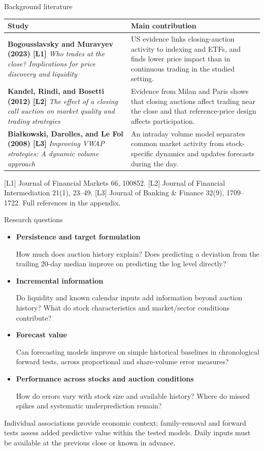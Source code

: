 \documentclass[aspectratio=169,11pt]{beamer}
\newcommand{\source}[1]{\par\vfill{\fontsize{7.5}{9}\selectfont\color{Muted}#1\par}}
\newenvironment{points}{\begin{itemize}\setlength{\itemsep}{0.65em}}{\end{itemize}}
\begin{document}
\begin{frame}{Background literature}
\small
\begin{tabularx}{\textwidth}{@{}L{6.0cm}Y@{}}
\toprule
\textbf{Study} & \textbf{Main contribution}\\
\midrule
\textbf{Bogousslavsky and Muravyev (2023) [L1]}\newline
\emph{Who trades at the close? Implications for price discovery and liquidity}
& US evidence links closing-auction activity to indexing and ETFs, and finds lower price impact than in continuous trading in the studied setting.\\[0.9em]
\textbf{Kandel, Rindi, and Bosetti (2012) [L2]}\newline
\emph{The effect of a closing call auction on market quality and trading strategies}
& Evidence from Milan and Paris shows that closing auctions affect trading near the close and that reference-price design affects participation.\\[0.9em]
\textbf{Bia{\l}kowski, Darolles, and Le Fol (2008) [L3]}\newline
\emph{Improving VWAP strategies: A dynamic volume approach}
& An intraday volume model separates common market activity from stock-specific dynamics and updates forecasts during the day.\\
\bottomrule
\end{tabularx}
\source{[L1] Journal of Financial Markets 66, 100852. [L2] Journal of Financial Intermediation 21(1), 23--49. [L3] Journal of Banking \& Finance 32(9), 1709--1722. Full references in the appendix.}
\end{frame}

\begin{frame}{Research questions}
\begin{points}
\item \textbf{Persistence and target formulation}\par
How much does auction history explain? Does predicting a deviation from the trailing 20-day median improve on predicting the log level directly?
\item \textbf{Incremental information}\par
Do liquidity and known calendar inputs add information beyond auction history? What do stock characteristics and market/sector conditions contribute?
\item \textbf{Forecast value}\par
Can forecasting models improve on simple historical baselines in chronological forward tests, across proportional and share-volume error measures?
\item \textbf{Performance across stocks and auction conditions}\par
How do errors vary with stock size and available history? Where do missed spikes and systematic underprediction remain?
\end{points}
\source{Individual associations provide economic context; family-removal and forward tests assess added predictive value within the tested models. Daily inputs must be available at the previous close or known in advance.}
\end{frame}
\end{document}
